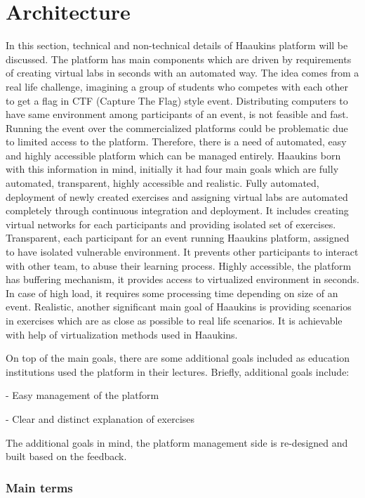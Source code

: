 \chapter{Architecture}\label{chapter:}

In this section, technical and non-technical details of Haaukins platform will be discussed. The platform has main components which are driven by requirements of creating virtual labs in seconds with an automated way.  The idea comes from a real life challenge, imagining a group of students who competes with each other to get a flag in CTF (Capture The Flag) style event. Distributing computers to have same environment among participants of an event, is not feasible and fast. Running the event over the commercialized platforms could be problematic due to limited access to the platform. Therefore, there is a need of automated, easy and highly accessible platform which can be managed entirely. Haaukins born with this information in mind, initially it had four main goals which are fully automated, transparent, highly accessible and realistic\cite{8820918}. 
Fully automated, deployment of newly created exercises and assigning virtual labs are automated completely through continuous integration and deployment. It includes creating virtual networks for each participants and providing isolated set of exercises. 
Transparent, each participant for an event running Haaukins platform, assigned to have isolated vulnerable environment. It prevents other participants to interact with other team, to abuse their learning process. 
Highly accessible, the platform has buffering mechanism, it provides access to virtualized environment in seconds. In case of high load, it requires some processing time depending on size of an event. 
Realistic, another significant main goal of Haaukins is providing scenarios in exercises which are as close as possible to real life scenarios. It is achievable with help of virtualization methods used in Haaukins. 

On top of the main goals, there are some additional goals included as education institutions used the platform in their lectures. Briefly, additional goals include: 

- Easy management of the platform

- Clear and distinct explanation of exercises 

The additional goals in mind, the platform management side is re-designed and built based on the feedback. 

\subsection{Main terms}
 
